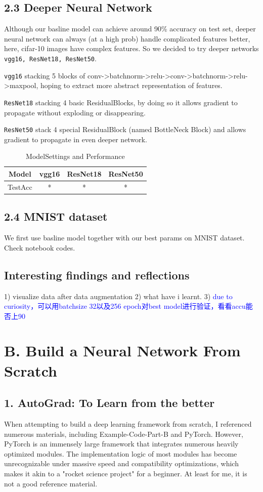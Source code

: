 \documentclass{article}
\newcommand{\subs}[1]{\subsection*{#1}}
\newcommand{\secs}[1]{\section*{#1}}
\begin{document}
\subs{2.3 Deeper Neural Network}
Although our basline model can achieve around 90\% accuracy on test set, deeper neural network can always (at a high prob) handle complicated features better, here, cifar-10 images have complex features. So we decided to try deeper networks \texttt{vgg16, ResNet18, ResNet50}.

\texttt{vgg16} stacking 5 blocks of conv->batchnorm->relu->conv->batchnorm->relu->maxpool, hoping to extract more abstract representation of features.

\texttt{ResNet18} stacking 4 basic ResidualBlocks, by doing so it allows gradient to propagate without exploding or disappearing.

\texttt{ResNet50} stack 4 special ResidualBlock (named BottleNeck Block) and allows gradient to propagate in even deeper network.

\begin{table}[htbp]
  \centering
  \caption{ModelSettings and Performance}
  \label{tab:model-compare}
  \begin{tabular}{|c|ccc|} 
    \hline
    Model & vgg16 & ResNet18 & ResNet50  \\
    \hline
    TestAcc & * & * & *  \\
    \hline
  \end{tabular} 
\end{table}






\subs{2.4 MNIST dataset}
We first use basline model together with our best params on MNIST dataset. Check notebook codes.


\subs{Interesting findings and reflections}
1) visualize data after data augmentation
2) what have i learnt.
3) \textcolor{blue}{due to curiosity，可以用batchsize 32以及256 epoch对best model进行验证，看看accu能否上90}

\newpage
\secs{B. Build a Neural Network From Scratch}
\subs{1. AutoGrad: To Learn from the better}
When attempting to build a deep learning framework from scratch, I referenced numerous materials, including Example-Code-Part-B and PyTorch. However, PyTorch is an immensely large framework that integrates numerous heavily optimized modules. The implementation logic of most modules has become unrecognizable under massive speed and compatibility optimizations, which makes it akin to a "rocket science project" for a beginner. At least for me, it is not a good reference material.\\
\end{document}

